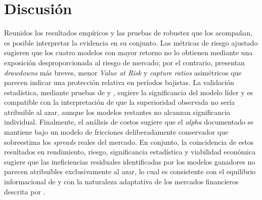 ﻿\documentclass[11pt,a4paper]{article}
\begin{document}




\section{Discusi\'on}
\label{sec:discussion}

Reunidos los resultados emp\'iricos y las pruebas de robustez que los acompa\~nan, es posible interpretar la evidencia en su conjunto. Las m\'etricas de riesgo ajustado sugieren que los cuatro modelos con mayor retorno no lo obtienen mediante una exposici\'on desproporcionada al riesgo de mercado; por el contrario, presentan \textit{drawdowns} m\'as breves, menor \textit{Value at Risk} y \textit{capture ratios} asim\'etricos que parecen indicar una protecci\'on relativa en per\'iodos bajistas. La validaci\'on estad\'istica, mediante pruebas de \citet{diebold1995} y \citet{clark2007approximately}, sugiere la significancia del modelo l\'ider y es compatible con la interpretaci\'on de que la superioridad observada no ser\'ia atribuible al azar, aunque los modelos restantes no alcanzan significancia individual. Finalmente, el an\'alisis de costos sugiere que el \textit{alpha} documentado se mantiene bajo un modelo de fricciones deliberadamente conservador que sobreestima los \textit{spreads} reales del mercado. En conjunto, la coincidencia de estos resultados en rendimiento, riesgo, significancia estad\'istica y viabilidad econ\'omica sugiere que las ineficiencias residuales identificadas por los modelos ganadores no parecen atribuibles exclusivamente al azar, lo cual es consistente con el equilibrio informacional de \citet{grossman1980} y con la naturaleza adaptativa de los mercados financieros descrita por \citet{lo2019}.
\end{document}
